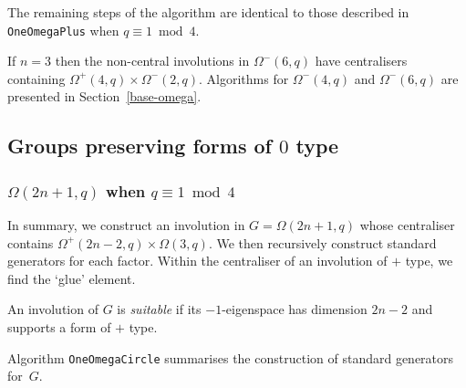 \documentclass[12pt]{article}
\begin{document}
The remaining steps of the algorithm are identical
to those described in {\tt OneOmegaPlus}
when $q\equiv1\bmod4$.

If $n = 3$ then the non-central involutions in $\Omega^-(6,q)$
have centralisers containing $\Omega^+(4,q)\times\Omega^-(2,q)$. 
Algorithms for $\Omega^-(4,q)$ and $\Omega^-(6, q)$ are presented  
in Section~\ref{base-omega}.

\subsection{Groups preserving forms of $0$ type}

\subsubsection{$\Omega(2n+1,q)$ when $q\equiv 1\bmod4$}\label{omega0}
In summary, we construct an involution in $G = \Omega(2n+1,q)$ 
whose centraliser contains $\Omega^+(2n-2,q) \times \Omega(3,q)$.
We then recursively construct standard generators for each factor. 
Within the centraliser of an involution of $+$ type,
we find the `glue' element. 

An involution of $G$ is {\it suitable} if its $-1$-eigenspace has 
dimension $2n - 2$ and supports a form of $+$ type.

Algorithm {\tt OneOmegaCircle} summarises the construction
of standard generators for~$G$.
\end{document}
